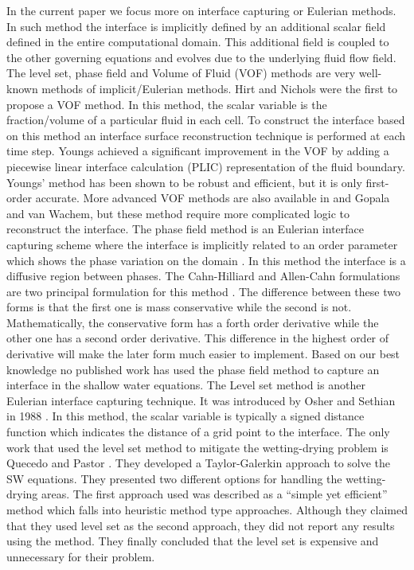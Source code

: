 \documentclass[letterpaper,10pt]{article}
\begin{document}
In the current paper we focus more on interface capturing or Eulerian methods. In such method the interface is implicitly defined by an additional scalar field defined in the entire 
computational domain. This additional field is coupled to the other governing equations and evolves due to the underlying fluid flow field.
The level set, phase field and Volume of Fluid (VOF) methods are very well-known methods of implicit/Eulerian methods.
Hirt and Nichols \cite{hirt1981vfv} were the first to propose a VOF method. 
In this method, the scalar variable is the fraction/volume of a particular fluid in each cell.
To construct the interface based on this method an interface surface reconstruction technique is performed at each time step. 
Youngs \cite{youngs1982tdm} achieved a significant improvement 
in the VOF by adding a piecewise linear interface calculation (PLIC) representation of the fluid boundary. 
Youngs' method has been shown to be robust and efficient, but it is only first-order accurate. 
More advanced VOF methods are also available in \cite{gerlach2006cvf} and Gopala and van Wachem\cite{gopala2008vfm}, but these method require more complicated logic to 
reconstruct the interface.
The phase field method is an Eulerian interface capturing scheme where the interface is implicitly related to an order parameter which shows the phase variation on the domain \cite{Anderson1998}. 
In this method the interface is a diffusive region between phases. 
The Cahn-Hilliard and Allen-Cahn formulations are two principal formulation for this method \cite{CahnHilliard1958i,CahnHilliard1958ii,Yang2006}. The difference between these two forms is 
that the first one is mass conservative while the second is not. Mathematically, the conservative form has a forth order derivative while the other one has a second order derivative. 
This difference in the highest order of derivative will make the later form much easier to implement.
Based on our best knowledge no published work has used the phase field method to capture an interface in the shallow water equations.
The Level set method is another Eulerian interface capturing technique. It was introduced by Osher and Sethian in 1988 \cite{Osher1988}. In this method, the scalar variable is typically 
a signed distance function which indicates the distance of a grid point to the interface. 
The only work that used the level set method to mitigate the wetting-drying problem is Quecedo and Pastor \cite{quecedo2002rtg}. 
They developed a Taylor-Galerkin approach to solve the SW equations. They presented two 
different options for handling the wetting-drying areas. The first approach used was described as a ``simple yet efficient'' method which falls into heuristic method type approaches. 
Although they claimed that they used level set as the second approach, they did not report any results using the method.
They finally concluded that the level set is expensive and unnecessary for their problem.
\end{document}
